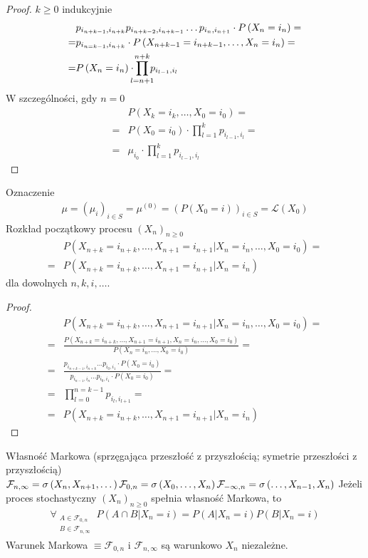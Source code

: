 \begin{proof}
$ k\ge 0 $ indukcyjnie
\begin{align*}
&p_{i_{n+k-1},i_{n+k}}
p_{i_{n+k-2},i_{n+k-1}}
\dots
p_{i_n,i_{n+1}}
\cdot P\left(X_n=i_n\right)
=\\=&
p_{i_{n=k-1},i_{n+k}}\cdot P\left(X_{n+k-1}=i_{n+k-1},\dots,X_n=i_n\right)
=\\=&
P\left(X_n=i_n\right)\cdot\prod_{\mathclap{l=n+1}}^{\mathclap{{n+k}}}p_{i_{l-1},i_l}
\end{align*}
W szczególności, gdy $ n=0 $
\begin{align*}
&P\left(X_k=i_k,\dots,X_0=i_0\right)
=\\=&
P\left(X_0=i_0\right)\cdot \prod_{l=1}^{k}p_{i_{l-1},i_l}
=\\=&
\mu_{i_0}\cdot\prod_{l=1}^{k}p_{i_{l-1},i_l}
\end{align*}
\end{proof}
Oznaczenie
\begin{gather*}
\mu=\left(\mu_i\right)_{i\in S}=
\mu^{(0)}=
\left(P\left(X_0=i\right)\right)_{i\in S}=
\mathcal L\left(X_0\right)
\end{gather*}
Rozkład początkowy procesu $ \left(X_n\right)_{n\ge 0} $
\begin{align*}
&P\left(X_{n+k}=i_{n+k},\dots,X_{n+1}=i_{n+1}|X_n=i_n,\dots,X_0=i_0\right)
=\\=&
P\left(X_{n+k}=i_{n+k},\dots,X_{n+1}=i_{n+1}|X_n=i_n\right)
\end{align*}
dla dowolnych $ n,k,i,\dots  $.
\begin{proof}
\begin{align*}
&P\left(X_{n+k}=i_{n+k},\dots,X_{n+1}=i_{n+1}|X_n=i_n,\dots,X_0=i_0\right)
=\\=&
\frac{P\left(X_{n+k}=i_{n+k},\dots,X_{n+1}=i_{n+1},X_n=i_n,\dots,X_0=i_0\right)}{P\left(X_n=i_n,\dots,X_0=i_0\right)}
=\\=&
\frac{p_{i_{n+k-1},i_{n+k}}
\dots
p_{i_0,i_1}
\cdot P\left(X_0=i_0\right)}{p_{i_{n-1},i_{n}}
\dots
p_{i_0,i_1}
\cdot P\left(X_0=i_0\right)}
=\\=&
\prod_{l=0}^{n=k-1}p_{i_l,i_{l+1}}
=\\=&
P\left(X_{n+k}=i_{n+k},\dots,X_{n+1}=i_{n+1}|X_n=i_n\right)
\end{align*}
\end{proof}
Własność Markowa (sprzęgająca przeszłość z przyszłością; symetrie przeszłości z przyszłością)\\
$
\mathcal F_{n,\infty}=\sigma\left(X_n,X_{n+1},\dots\right)\\
\mathcal F_{0,n}=\sigma\left(X_0,\dots,X_{n}\right)\\
\mathcal F_{-\infty ,n}=\sigma\left(\dots,X_{n-1},X_n\right)
$
Jeżeli proces stochastyczny $ \left(X_n\right)_{n\ge0} $ spełnia własność Markowa, to
\begin{gather*}
\forall_{\substack{A\in\mathcal F_{0,n}\\B\in \mathcal F_{n,\infty }}}\;
P\left(A\cap B|X_n=i\right)
=
P\left(A|X_n=i\right)P\left(B|X_n=i\right)
\end{gather*}
Warunek Markowa $ \equiv  \mathcal F_{0,n}$ i $ \mathcal F_{n,\infty } $ są warunkowo $ X_n $ niezależne.

